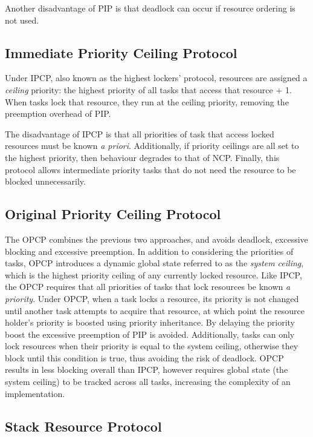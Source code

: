 Another disadvantage of \gls{PIP} is that deadlock can occur if resource ordering is not used.


\subsection{Immediate Priority Ceiling Protocol}
\label{sec:hlp}
\label{sec:ipcp}

Under \gls{IPCP}, also known as the highest lockers' protocol, resources are assigned a
\emph{ceiling} priority: the highest priority of all tasks that access that resource + 1.  When tasks
lock that resource, they run at the ceiling priority, removing the preemption overhead
of \gls{PIP}.

The disadvantage of \gls{IPCP} is that all priorities of task that access locked resources must be known \emph{a
priori}.  Additionally, if priority ceilings are all set to the highest priority, then behaviour
degrades to that of \gls{NCP}. Finally, this protocol allows intermediate priority tasks that do not need
the resource to be blocked unnecessarily. 

\subsection{Original Priority Ceiling Protocol}
\label{sec:opcp}

The \gls{OPCP} combines the previous two approaches, and avoids deadlock, excessive blocking and
excessive preemption. In addition to considering the priorities of tasks, \gls{OPCP} introduces
a dynamic global state referred to as the \emph{system ceiling}, which is the highest
priority ceiling of any currently locked resource. Like \gls{IPCP}, the \gls{OPCP} requires that all
priorities of tasks that lock resources be known \emph{a priority}. Under \gls{OPCP}, when a task locks a resource, its priority 
is not changed until another task attempts to acquire that resource, at which point the resource
holder's priority is boosted using priority inheritance. By delaying the priority boost the excessive 
preemption of \gls{PIP} is avoided. Additionally, tasks can only lock resources
when their priority is equal to the system ceiling, otherwise they block until this condition is
true, thus avoiding the risk of deadlock. \gls{OPCP} results in less blocking overall than \gls{IPCP},
however requires global state (the system ceiling) to be tracked across all tasks,
increasing the complexity of an implementation.

\subsection{Stack Resource Protocol}

